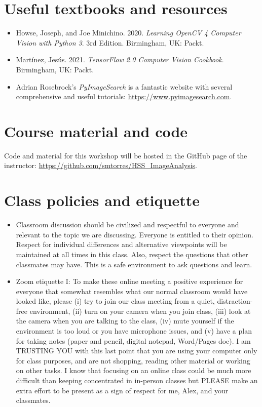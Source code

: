 \documentclass[11pt]{article}
\begin{document}
\begin{flushleft}
\section{Useful textbooks and resources}\label{required-texts-and-materials}
\begin{itemize}
    \item Howse, Joseph, and Joe Minichino. 2020. \emph{Learning OpenCV 4 Computer Vision with Python 3}. 3rd Edition. Birmingham, UK: Packt.
    \item Mart\'{i}nez, Jes\'{u}s. 2021. \emph{TensorFlow 2.0 Computer Vision Cookbook}. Birmingham, UK: Packt.
    \item Adrian Rosebrock's \emph{PyImageSearch} is a fantastic website with several comprehensive and useful tutorials: \url{https://www.pyimagesearch.com}.
\end{itemize}


\section{Course material and code}
Code and material for this workshop will be hosted in the GitHub page of the instructor: \url{https://github.com/smtorres/HSS_ImageAnalysis}.


\section{Class policies and etiquette}
\begin{itemize}
    \item Classroom discussion should be civilized and respectful to everyone and relevant to the topic we are discussing. Everyone is entitled to their opinion. Respect for individual differences and alternative viewpoints will be maintained at all times in this class. Also, respect the questions that other classmates may have. This is a safe environment to ask questions and learn.

    \item Zoom etiquette I: To make these online meeting a positive experience for everyone that somewhat resembles what our normal classroom would have looked like, please (i) try to join our class meeting from a quiet, distraction-free environment, (ii) turn on your camera when you join class, (iii) look at the camera when you are talking to the class, (iv) mute yourself if the environment is too loud or you have microphone issues, and (v) have a plan for taking notes (paper and pencil, digital notepad, Word/Pages doc). I am TRUSTING YOU with this last point that you are using your computer only for class purposes, and are not shopping, reading other material or working on other tasks. I know that focusing on an online class could be much more difficult than keeping concentrated in in-person classes but PLEASE make an extra effort to be present as a sign of respect for me, Alex, and your classmates.
\end{itemize}


\end{flushleft}
\end{document}
